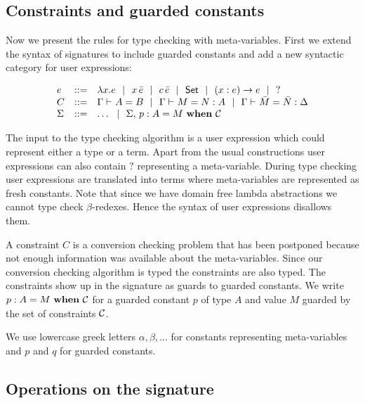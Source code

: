 \subsection{Constraints and guarded constants}

Now we present the rules for type checking with meta-variables. First we extend
the syntax of signatures to include guarded constants and add a new syntactic
category for user expressions:

\[\begin{array}{lcll}
    e & ::= & \lambda x.{}e ~~|~~ x\,\bar e ~~|~~ c\,\bar e ~~|~~ \mathsf{Set} ~~|~~ (x:e)\to{}e ~~|~~ ? \\
    C & ::= & {\Gamma} \vdash_{}A=B ~~|~~ {\Gamma} \vdash_{}M=N:A ~~|~~
	      {\Gamma} \vdash_{}\bar M=\bar N:\Delta \\
    \Sigma & ::= & \ldots ~~|~~
		{\Sigma},\,{} {p} : {A} = {M} ~\mathbf{when}~ {\mathcal{C}} \\
\end{array}\]

The input to the type checking algorithm is a user expression which could
represent either a type or a term. Apart from the usual constructions user
expressions can also contain $?$ representing a meta-variable. During type
checking user expressions are translated into {\Core} terms where meta-variables are represented as fresh constants. Note that since we have domain
free lambda abstractions we cannot type check $\beta$-redexes. Hence the syntax
of user expressions disallows them.

A constraint $C$ is a conversion checking problem that has been postponed
because not enough information was available about the meta-variables. Since
our conversion checking algorithm is typed the constraints are also typed. The
constraints show up in the signature as guards to guarded constants. We write
${p} : {A} = {M} ~\mathbf{when}~ {\mathcal{C}}$ for a guarded constant $p$ of type $A$ and value $M$
guarded by the set of constraints $\mathcal{C}$.

We use lowercase greek letters $\alpha, \beta, \ldots$ for constants
representing meta-variables and $p$ and $q$ for guarded constants.

\subsection{Operations on the signature}

